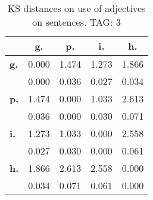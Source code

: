 \begin{table}[h!]
\begin{center}
\begin{tabular}{| l || c | c | c | c |}\hline
 & {\bf g.} & {\bf p.} & {\bf i.} & {\bf h.} \\\hline\hline
{\bf g.} & 0.000 & 1.474 & 1.273 & 1.866 \\
{\bf } & 0.000 & 0.036 & 0.027 & 0.034 \\\hline
{\bf p.} & 1.474 & 0.000 & 1.033 & 2.613 \\
{\bf } & 0.036 & 0.000 & 0.030 & 0.071 \\\hline
{\bf i.} & 1.273 & 1.033 & 0.000 & 2.558 \\
{\bf } & 0.027 & 0.030 & 0.000 & 0.061 \\\hline
{\bf h.} & 1.866 & 2.613 & 2.558 & 0.000 \\
{\bf } & 0.034 & 0.071 & 0.061 & 0.000 \\\hline
\end{tabular}
\caption{KS distances on use of adjectives on sentences. TAG: 3}
\end{center}
\end{table}